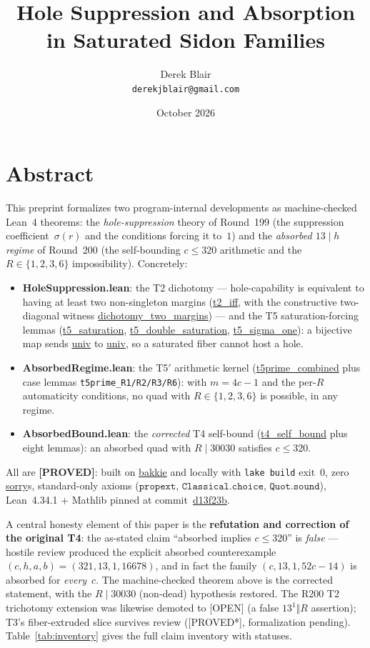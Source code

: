 \documentclass[11pt,a4paper]{article}
\title{Hole Suppression and Absorption in Saturated Sidon Families}
\author{Derek Blair \\ \texttt{derekjblair@gmail.com}}
\date{October 2026}
\theoremstyle{definition}
\begin{document}
\maketitle

\section{Abstract}

This preprint formalizes two program-internal developments as
machine-checked Lean~4 theorems: the \emph{hole-suppression} theory of
Round~199 (the suppression coefficient~$\sigma(r)$ and the conditions
forcing it to~$1$) and the \emph{absorbed $13\mid h$ regime} of
Round~200 (the self-bounding $c\le 320$ arithmetic and the
$R\in\{1,2,3,6\}$ impossibility). Concretely:

\begin{itemize}
\item \textbf{HoleSuppression.lean}: the T2 dichotomy ---
  hole-capability is equivalent to having at least two non-singleton
  margins (\url{t2_iff}, with the constructive two-diagonal witness
  \url{dichotomy_two_margins}) --- and the T5 saturation-forcing
  lemmas (\url{t5_saturation}, \url{t5_double_saturation},
  \url{t5_sigma_one}): a bijective map sends \url{univ} to
  \url{univ}, so a saturated fiber cannot host a hole.
\item \textbf{AbsorbedRegime.lean}: the T5$'$ arithmetic kernel
  (\url{t5prime_combined} plus case lemmas
  \texttt{t5prime\_R1/R2/R3/R6}): with $m=4c-1$ and the per-$R$
  automaticity conditions, no quad with $R\in\{1,2,3,6\}$ is possible,
  in any regime.
\item \textbf{AbsorbedBound.lean}: the \emph{corrected} T4 self-bound
  (\url{t4_self_bound} plus eight lemmas): an absorbed quad with
  $R\mid30030$ satisfies $c\le320$.
\end{itemize}

All are \textbf{[PROVED]}: built on \url{bakkie} and locally with
\texttt{lake build} exit~0, zero \url{sorry}s, standard-only axioms
($\texttt{propext}$, $\texttt{Classical.choice}$, $\texttt{Quot.sound}$),
Lean~4.34.1 + Mathlib pinned at commit~\url{d13f23b}.

A central honesty element of this paper is the \textbf{refutation and
correction of the original T4}: the as-stated claim ``absorbed implies
$c\le320$'' is \emph{false} --- hostile review produced the explicit
absorbed counterexample $(c,h,a,b)=(321,13,1,16678)$, and in fact the
family $(c,13,1,52c-14)$ is absorbed for \emph{every}~$c$. The
machine-checked theorem above is the corrected statement, with the
$R\mid30030$ (non-dead) hypothesis restored. The R200 T2 trichotomy
extension was likewise demoted to [OPEN] (a false $13^1\Vert R$
assertion); T3's fiber-extruded slice survives review
([PROVED*], formalization pending). Table~\ref{tab:inventory} gives the
full claim inventory with statuses.
\end{document}

